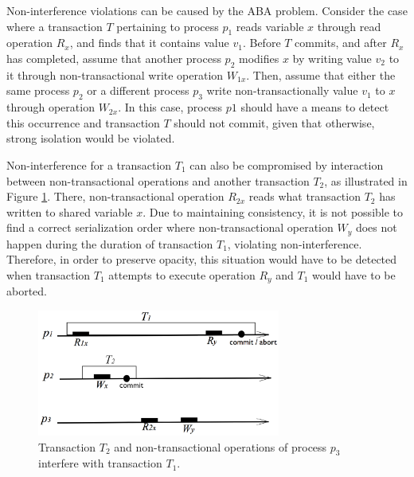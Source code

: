 \documentclass[11pt,letterpaper]{article}
\newcommand{\Xomit}[1]{}
\begin{document}
Non-interference violations can be caused  by the ABA problem. Consider the
case where a transaction $T$  
pertaining  to process  $p_1$  reads variable  $x$  through read  operation
$R_x$, and finds that it contains value  
$v_1$.  Before $T$  commits, and  after  $R_x$ has  completed, assume  that
another process $p_2$ modifies $x$  
by  writing value  $v_2$ to  it through  non-transactional  write operation
$W_{1x}$. Then, assume that either the  
same process  $p_2$ or a different process  $p_3$ write non-transactionally
value $v_1$ to $x$ through operation  
$W_{2x}$. In  this case, process  $p1$ should have  a means to  detect this
occurrence and transaction $T$ should  
not commit, given that otherwise, strong isolation would be violated. 


Non-interference for  a transaction  $T_1$ can also  be compromised  by 
interaction between non-transactional  
operations  and  another  transaction   $T_2$,  as  illustrated  in  Figure
\ref{fig:timent}. There, non-transactional operation  
$R_{2x}$  reads  what transaction  $T_2$  has  written  to shared  variable
$x$. Due to maintaining consistency, it is not  
possible  to find  a  correct serialization  order where  non-transactional
operation $W_y$ does not happen during the  
duration  of transaction $T_1$,  violating non-interference.  Therefore, in
order to preserve opacity, this situation would  
have to  be detected when  transaction $T_1$ attempts to  execute operation
$R_y$ and $T_1$ would have to be aborted. 
 

\begin{figure}[h]
\centerline{
    \mbox{\includegraphics[width=80mm]{imgs/time_NT.eps}}
}
\caption{Transaction  $T_2$  and  non-transactional operations  of  process
$p_3$ interfere with transaction $T_1$.} 
\label{fig:timent}
\end{figure}


\Xomit{%
Many  TM algorithms,  and  so  also TL2,  already  trivially satisfy  strong
isolation and the characteristics that we consider that it implies,  
provided   that    shared   memory   is    exclusively   accessed   through
transactions. When shared memory is accessed through non-transactional  
operations also, the TM algorithm that is used has to be extended so that it
prevents the scenarios discussed above.  
} %
\end{document}
